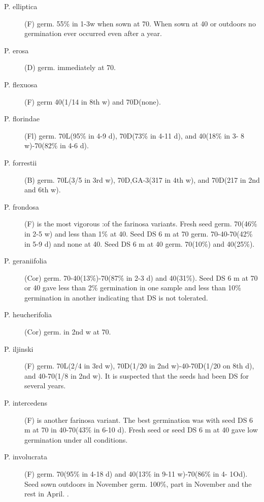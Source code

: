 \begin{description}
\item[P. elliptica] (F) germ. 55\% in 1-3w when sown at 70. When sown at 40 or
outdoors no germination ever occurred even after a year.
\item[P. erosa] (D) germ. immediately at 70.
\item[P. flexuosa] (F) germ 40(1/14 in 8th w) and 70D(none).
\item[P. florindae] (Fl) germ. 70L(95\% in 4-9 d), 70D(73\% in 4-11 d), and 40(18\% in 3-
8 w)-70(82\% in 4-6 d).
\item[P. forrestii] (B) germ. 70L(3/5 in 3rd w), 70D,GA-3(317 in 4th w), and 70D(217 in
2nd and 6th w).
\item[P. frondosa] (F) is the most vigorous :of the farinosa variants. Fresh seed germ.
70(46\% in 2-5 w) and less than 1\% at 40. Seed DS 6 m at 70 germ. 70-40-70(42\% in
5-9 d) and none at 40. Seed DS 6 m at 40 germ. 70(10\%) and 40(25\%).
\item[P. geraniifolia] (Cor) germ. 70-40(13\%)-70(87\% in 2-3 d) and 40(31\%). Seed
DS 6 m at 70 or 40 gave less than 2\% germination in one sample and less than 10\%
germination in another indicating that DS is not tolerated.
\item[P. heucherifolia] (Cor) germ. in 2nd w at 70.
\item[P. iljinski] (F) germ. 70L(2/4 in 3rd w), 70D(1/20 in 2nd w)-40-70D(1/20 on 8th d),
and 40-70(1/8 in 2nd w). It is suspected that the seeds had been DS for several years.
\item[P. intercedens] (F) is another farinosa variant. The best germination was with
seed DS 6 m at 70 in 40-70(43\% in 6-10 d). Fresh seed or seed DS 6 m at 40 gave
low germination under all conditions.

\item[P. involucrata] (F) germ. 70(95\% in 4-18 d) and 40(13\% in 9-11 w)-70(86\% in 4-
1Od). Seed sown outdoors in November germ. 100\%, part in November and the rest
in April. .


\end{description}
